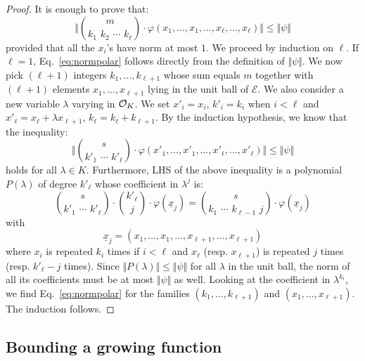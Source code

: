 \documentclass{sig-alternate}
\begin{document}
\begin{proof}
It is enough to prove that:
\begin{equation}
\label{eq:normpolar}
\Big\Vert \binom m {k_1 \,\, k_2 \,\, \cdots \,\, k_\ell} \cdot
\varphi(x_1, \ldots, x_1, \ldots, x_\ell, \ldots,
x_\ell) \Big\Vert \leq \Vert \psi \Vert
\end{equation}
provided that all the $x_i$'s have norm at most $1$. We proceed by 
induction on 
$\ell$. If $\ell = 1$, Eq.~\eqref{eq:normpolar} follows directly from
the definition of $\Vert \psi \Vert$. 
We now pick $(\ell+1)$ integers $k_1, \ldots, k_{\ell+1}$ whose sum 
equals $m$ together with $(\ell+1)$ elements $x_1, \ldots, x_{\ell+1}$
lying in the unit ball of $\mathcal E$.
We also consider a new variable $\lambda$ varying in
$\mathcal O_K$. We set $x'_i = x_i$, $k'_i = k_i$ when $i < \ell$ and $x'_\ell 
= x_\ell + \lambda x_{\ell+1}$, $k_\ell = k_\ell + k_{\ell+1}$. By the 
induction hypothesis, we know that the inequality:
$$\Big\Vert \binom s {k'_1 \,\, \cdots \,\, k'_\ell} \cdot
\varphi(x'_1, \ldots, x'_1, \ldots, x'_\ell, \ldots, x'_\ell) \Big\Vert
\leq \Vert \psi \Vert$$
holds for all $\lambda \in K$. Furthermore, LHS of the above inequality
is a polynomial $P(\lambda)$ of degree $k'_\ell$ whose coefficient in 
$\lambda^j$ is:
$$\binom s {k'_1 \,\, \cdots \,\, k'_\ell} \cdot
\binom {k'_\ell} {j} \cdot
\varphi(\underline x_j) = 
\binom s {k_1 \,\, \cdots \,\, k_{\ell-1} \,\, j} \cdot
\varphi(\underline x_j)$$
with
$$\underline x_j = (x_1, \ldots, x_1, \ldots, x_{\ell+1}, \ldots, 
x_{\ell+1})$$
where $x_i$ is repeated $k_i$ times if $i < \ell$ and $x_\ell$ 
(resp. $x_{\ell+1}$) is repeated $j$ times (resp. $k'_\ell - j$ times).
Since $\Vert P(\lambda) \Vert \leq \Vert \psi \Vert$ for all $\lambda$ in 
the unit ball, the norm of all its coefficients must be at most $\Vert \psi
\Vert$ as well. Looking at the coefficient in $\lambda^{k_i}$, we find
Eq.~\eqref{eq:normpolar} for the families $(k_1, \ldots, k_{\ell+1})$ 
and $(x_1, \ldots, x_{\ell+1})$. The induction follows.
\end{proof}

\subsection{Bounding a growing function}
\label{ssec:boundLambdaf}
\end{document}
